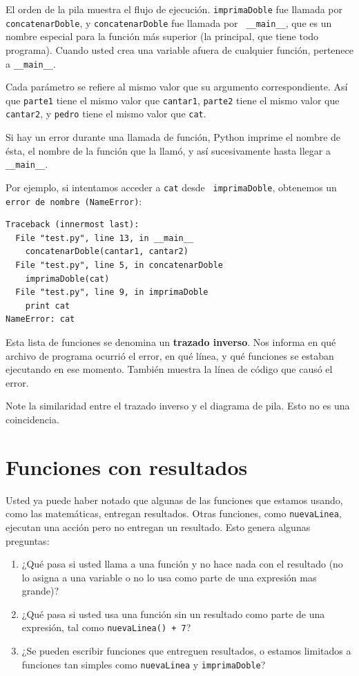 El orden de la pila muestra el flujo  de ejecución.  \texttt{imprimaDoble}
fue llamada por \texttt{concatenarDoble}, y \texttt{concatenarDoble} fue llamada por {\tt
\_\_main\_\_}, que es un nombre especial para la función más superior (la principal, que tiene todo programa). Cuando usted crea una variable afuera de cualquier función,
pertenece a {\tt\_\_main\_\_}.

Cada parámetro se refiere al mismo valor que su argumento correspondiente. Así que \texttt{parte1} tiene el mismo valor que \texttt{cantar1}, \texttt{parte2} tiene el mismo valor que \texttt{cantar2}, y \texttt{pedro} tiene el mismo valor que  \texttt{cat}.

Si hay un error durante una llamada de función, Python imprime el nombre de ésta, el
nombre de la función que la llamó, y así sucesivamente hasta llegar a \texttt{\_\_main\_\_}.

Por ejemplo, si intentamos acceder a  \texttt{cat} desde {\tt
imprimaDoble}, obtenemos un \texttt{error de nombre (NameError)}:

\beforeverb
\begin{verbatim}
Traceback (innermost last):
  File "test.py", line 13, in __main__
    concatenarDoble(cantar1, cantar2)
  File "test.py", line 5, in concatenarDoble
    imprimaDoble(cat)
  File "test.py", line 9, in imprimaDoble
    print cat
NameError: cat
\end{verbatim}
\afterverb
%
Esta lista de funciones se denomina un {\bf trazado inverso}. Nos informa
en qué archivo de programa ocurrió el error, en qué línea, y qué funciones
se estaban ejecutando en ese momento. También muestra la línea de código que
causó el error.


Note la similaridad entre el trazado inverso y el diagrama de pila. Esto no 
es una coincidencia.


\section{Funciones con resultados}

Usted ya puede haber notado que algunas de las funciones que estamos usando,
como las matemáticas, entregan resultados. Otras funciones, como \texttt{nuevaLinea}, 
ejecutan una acción pero no entregan un resultado. Esto genera algunas preguntas:

\begin{enumerate}

\item ¿Qué pasa si usted llama a una función y no hace nada con el resultado (no lo 
asigna a una variable o no lo usa como parte de una expresión mas grande)?

\item ¿Qué pasa si usted usa una función sin un resultado como parte de 
una expresión, tal como  \texttt{nuevaLinea() + 7}?

\item ¿Se pueden escribir funciones que entreguen resultados, o estamos limitados
a funciones tan simples como \texttt{nuevaLinea} y \texttt{imprimaDoble}?

\end{enumerate}

